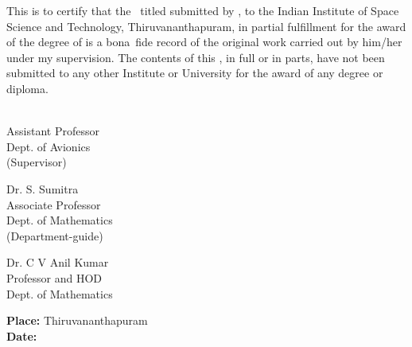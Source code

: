 This is to certify that the \Doctype\ titled \textbf{\textit{\Title}}
submitted by {\bf\Author}, to the Indian Institute of Space Science and
Technology, Thiruvananthapuram, in partial fulfillment for the award of the
degree of {\bf\Degreetext} is a bona~fide record of the original work carried
out by him/her under my supervision. The contents of this \Doctype, in full or
in parts, have not been submitted to any other Institute or University for
the award of any degree or diploma.

\vspace{35mm}
\noindent
\begin{minipage}{0.3\textwidth}
\Advisor\\
Assistant Professor\\
Dept. of Avionics\\
(Supervisor)
\end{minipage}
\begin{minipage}{0.3\textwidth}
	Dr. S. Sumitra\\
	Associate Professor\\
	Dept. of Mathematics\\
	(Department-guide)
\end{minipage}
\hspace{2cm}
\begin{minipage}{0.3\textwidth}
Dr. C V Anil Kumar\\
Professor and HOD\\
Dept. of Mathematics\\
\end{minipage}

\vspace{30mm}
\noindent
\textbf{Place: }Thiruvananthapuram\\
\textbf{Date: \ }\Date



